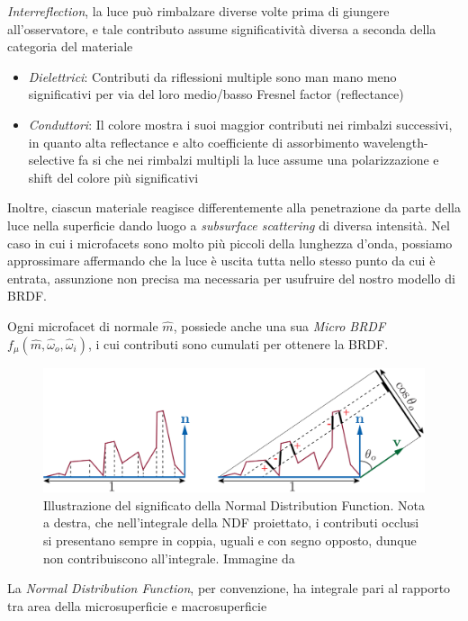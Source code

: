 \textit{Interreflection}, la luce pu\`o rimbalzare diverse volte prima di giungere all'osservatore, e tale contributo assume significativit\`a 
diversa a seconda della categoria del materiale \cite{akenine-moller}
\begin{itemize}[topsep=0pt,noitemsep]
	\item \textit{Dielettrici}: Contributi da riflessioni multiple sono man mano meno significativi per via del loro medio/basso Fresnel factor 
		(reflectance)
	\item \textit{Conduttori}: Il colore mostra i suoi maggior contributi nei rimbalzi successivi, in quanto alta reflectance e alto coefficiente di 
		assorbimento wavelength-selective fa si che nei rimbalzi multipli la luce assume una polarizzazione e shift del colore pi\`u significativi
\end{itemize}
Inoltre, ciascun materiale reagisce differentemente alla penetrazione da parte della luce nella superficie dando luogo a \textit{subsurface scattering}
di diversa intensit\`a. Nel caso in cui i microfacets sono molto pi\`u piccoli della lunghezza d'onda, possiamo approssimare affermando che la 
luce \`e uscita tutta nello stesso punto da cui \`e entrata, assunzione non precisa ma necessaria per usufruire del nostro modello di BRDF.\par
Ogni microfacet di normale $\hat{m}$, possiede anche una sua \textit{Micro BRDF} $f_\mu(\hat{m},\hat{\omega}_o,\hat{\omega}_i)$, i cui contributi sono
cumulati per ottenere la BRDF.\par
\begin{figure}
	\centering
	\includegraphics[width=\linewidth]{../assets/chapter3_surface_microgeometry_areaAM.png}
	\caption{Illustrazione del significato della Normal Distribution Function. Nota a destra, che nell'integrale della NDF proiettato, i contributi 
	occlusi si presentano sempre in coppia, uguali e con segno opposto, dunque non contribuiscono all'integrale. Immagine da \cite{akenine-moller}}
	\label{chapter3:surface:microgeometryArea}
\end{figure}
La \textit{Normal Distribution Function}, per convenzione, ha integrale pari al rapporto tra area della microsuperficie e macrosuperficie
